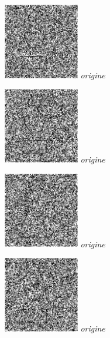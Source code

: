 \documentclass[a4,12pt]{article}
\begin{document}
\begin{minipage}[c]{0.20\linewidth}
	\begin{center}
		\includegraphics[width = 33mm]{./img/p2test_grad_mean_formes2bb40b.jpg}
		\textit{origine}
	\end{center}
\end{minipage}
\begin{minipage}[c]{0.20\linewidth}
	\begin{center}
		\includegraphics[width = 33mm]{./img/p2test_grad_mean_formes2bb40.jpg}
		\textit{origine}
	\end{center}
\end{minipage}
\begin{minipage}[c]{0.20\linewidth}
	\begin{center}
		\includegraphics[width = 33mm]{./img/p2test_grad_mean_formes2bb50b.jpg}
		\textit{origine}
	\end{center}
\end{minipage}
\begin{minipage}[c]{0.20\linewidth}
	\begin{center}
		\includegraphics[width = 33mm]{./img/p2test_grad_mean_formes2bb50.jpg}
		\textit{origine}
	\end{center}
\end{minipage}
\end{document}

